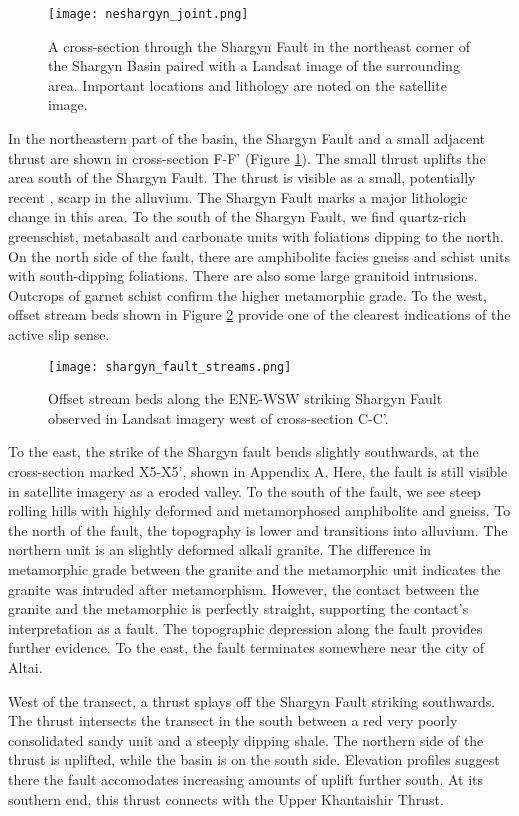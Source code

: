 \begin{figure}[h!]
  \centering
  \texttt{[image: neshargyn\_joint.png]}
  \caption{A cross-section through the Shargyn Fault in the northeast corner of the Shargyn Basin paired with a Landsat image of the surrounding area. Important locations and lithology are noted on the satellite image.}
  \label{neshargyn_joint}
\end{figure}

In the northeastern part of the basin, the Shargyn Fault and a small adjacent thrust are shown in cross-section F-F' (Figure \ref{neshargyn_joint}). The small thrust uplifts the area south of the Shargyn Fault. The thrust is visible as a small, potentially recent \citep{Bayasgalan2005a}, scarp in the alluvium. The Shargyn Fault marks a major lithologic change in this area. To the south of the Shargyn Fault, we find quartz-rich greenschist, metabasalt and carbonate units with foliations dipping to the north. On the north side of the fault, there are amphibolite facies gneiss and schist units with south-dipping foliations. There are also some large granitoid intrusions. Outcrops of garnet schist confirm the higher metamorphic grade. To the west, offset stream beds shown in Figure \ref{shargynoffsetstreams} provide one of the clearest indications of the active slip sense.

\begin{figure}[h!]
  \centering
  \texttt{[image: shargyn\_fault\_streams.png]}
  \caption{Offset stream beds along the ENE-WSW striking Shargyn Fault observed in Landsat imagery west of cross-section C-C'.}
  \label{shargynoffsetstreams}
\end{figure}

To the east, the strike of the Shargyn fault bends slightly southwards, at the cross-section marked X5-X5', shown in Appendix A. Here, the fault is still visible in satellite imagery as a eroded valley. To the south of the fault, we see steep rolling hills with highly deformed and metamorphosed amphibolite and gneiss. To the north of the fault, the topography is lower and transitions into alluvium. The northern unit is an slightly deformed alkali granite. The difference in metamorphic grade between the granite and the metamorphic unit indicates the granite was intruded after metamorphism. However, the contact between the granite and the metamorphic is perfectly straight, supporting the contact's interpretation as a fault. The topographic depression along the fault provides further evidence. To the east, the fault terminates somewhere near the city of Altai. 

West of the transect, a thrust splays off the Shargyn Fault striking southwards. The thrust intersects the transect in the south between a red very poorly consolidated sandy unit and a steeply dipping shale. The northern side of the thrust is uplifted, while the basin is on the south side. Elevation profiles suggest there the fault accomodates increasing amounts of uplift further south. At its southern end, this thrust connects with the Upper Khantaishir Thrust. 


